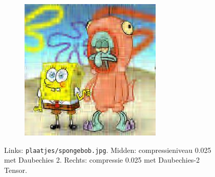 \begin{figure}
\begin{subfigure}[t]{0.32\textwidth}
	\end{subfigure}
	\begin{subfigure}[t]{0.32\textwidth}
	\includegraphics[width=\linewidth]{plaatjes/spongebob_db2_t_0_025.jpg}
	\end{subfigure}
	\caption{Links: \texttt{plaatjes/spongebob.jpg}. Midden: compressieniveau 0.025 met Daubechies 2. Rechts: compressie 0.025 met Daubechies-2 Tensor.}
	\label{fig:tensor_start}
\end{figure}
